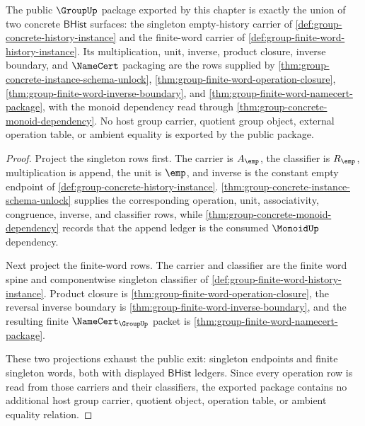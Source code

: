 \begin{theorem}
\label{thm:group-algebra-hierarchy-public-exit-package}
The public $\GroupUp$ package exported by this chapter is exactly the union of
two concrete $\mathsf{BHist}$ surfaces: the singleton empty-history carrier of
\autoref{def:group-concrete-history-instance} and the finite-word carrier of
\autoref{def:group-finite-word-history-instance}. Its multiplication, unit,
inverse, product closure, inverse boundary, and $\NameCert$ packaging are the
rows supplied by \autoref{thm:group-concrete-instance-schema-unlock},
\autoref{thm:group-finite-word-operation-closure},
\autoref{thm:group-finite-word-inverse-boundary}, and
\autoref{thm:group-finite-word-namecert-package}, with the monoid dependency
read through \autoref{thm:group-concrete-monoid-dependency}. No host group
carrier, quotient group object, external operation table, or ambient equality
is exported by the public package.
\end{theorem}
\begin{proof}
Project the singleton rows first. The carrier is $A_{\emp}$, the classifier is
$R_{\emp}$, multiplication is append, the unit is $\emp$, and inverse is the
constant empty endpoint of \autoref{def:group-concrete-history-instance}.
\autoref{thm:group-concrete-instance-schema-unlock} supplies the corresponding
operation, unit, associativity, congruence, inverse, and classifier rows, while
\autoref{thm:group-concrete-monoid-dependency} records that the append ledger is
the consumed $\MonoidUp$ dependency.

Next project the finite-word rows. The carrier and classifier are the finite
word spine and componentwise singleton classifier of
\autoref{def:group-finite-word-history-instance}. Product closure is
\autoref{thm:group-finite-word-operation-closure}, the reversal inverse
boundary is \autoref{thm:group-finite-word-inverse-boundary}, and the resulting
finite $\NameCert_{\GroupUp}$ packet is
\autoref{thm:group-finite-word-namecert-package}.

These two projections exhaust the public exit: singleton endpoints and finite
singleton words, both with displayed $\mathsf{BHist}$ ledgers. Since every
operation row is read from those carriers and their classifiers, the exported
package contains no additional host group carrier, quotient object, operation
table, or ambient equality relation.
\end{proof}

